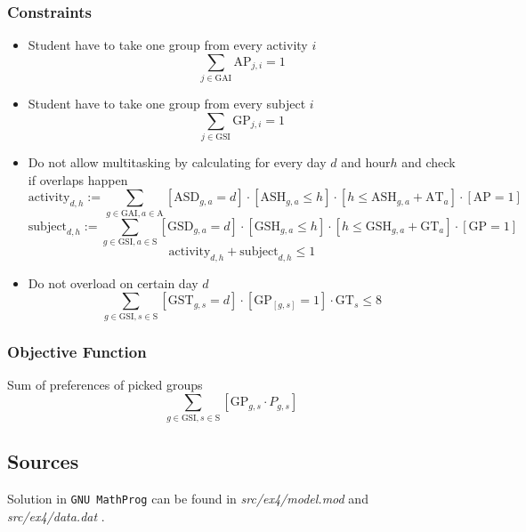 \subsubsection*{Constraints}
\begin{itemize}
    \item Student have to take one group from every activity $i$ 
     $$\sum_{j \in \textrm{GAI}} \textrm{AP}_{j,i} = 1$$
     \item Student have to take one group from every subject $i$ 
     $$\sum_{j \in \textrm{GSI}} \textrm{GP}_{j,i} = 1$$
     \item Do not allow multitasking by calculating for every day $d$ and hour$h$ and check if overlaps happen
     $$
     \textrm{activity}_{d,h} := \sum_{g \in \textrm{GAI}, a \in \textrm{A}}  [\textrm{ASD}_{g,a} = d] \cdot [\textrm{ASH}_{g,a} \leqslant h]\cdot [ h \leq \textrm{ASH}_{g,a} + \textrm{AT}_a]  \cdot [\textrm{AP} = 1]
     $$ 
     $$
     \textrm{subject}_{d,h} := \sum_{g \in \textrm{GSI}, a \in \textrm{S}}  [\textrm{GSD}_{g,a} = d] \cdot [\textrm{GSH}_{g,a} \leqslant h]\cdot [ h \leq \textrm{GSH}_{g,a} + \textrm{GT}_a]  \cdot [\textrm{GP} = 1]
     $$ 
     $$ \textrm{activity}_{d,h} + \textrm{subject}_{d,h} \leqslant 1 $$ 
    \item Do not overload on certain day $d$
    $$
    \sum_{g \in \textrm{GSI}, s \in \textrm{S}} [\textrm{GST}_{g,s} = d] \cdot [\textrm{GP}_[g,s] = 1] \cdot \textrm{GT}_s \leqslant 8
    $$
\end{itemize}
\subsubsection*{Objective Function}
Sum of preferences of picked groups
$$
\sum_{g \in \textrm{GSI}, s \in \textrm{S}} [\textrm{GP}_{g,s} \cdot P_{g,s}]$$
\subsection{Sources}
Solution in \texttt{GNU MathProg} can be found in \textit{src/ex4/model.mod} and \textit{src/ex4/data.dat} .

